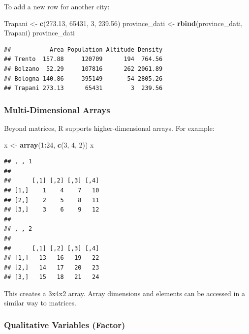 \documentclass[
]{article}
\newenvironment{Shaded}{\begin{snugshade}}{\end{snugshade}}
\newcommand{\DecValTok}[1]{\textcolor[rgb]{0.00,0.00,0.81}{#1}}
\newcommand{\FloatTok}[1]{\textcolor[rgb]{0.00,0.00,0.81}{#1}}
\newcommand{\FunctionTok}[1]{\textcolor[rgb]{0.13,0.29,0.53}{\textbf{#1}}}
\newcommand{\NormalTok}[1]{#1}
\newcommand{\OtherTok}[1]{\textcolor[rgb]{0.56,0.35,0.01}{#1}}
\newcommand{\SpecialCharTok}[1]{\textcolor[rgb]{0.81,0.36,0.00}{\textbf{#1}}}
\begin{document}
To add a new row for another city:

\begin{Shaded}
\begin{Highlighting}[]
\NormalTok{Trapani }\OtherTok{\textless{}{-}} \FunctionTok{c}\NormalTok{(}\FloatTok{273.13}\NormalTok{, }\DecValTok{65431}\NormalTok{, }\DecValTok{3}\NormalTok{, }\FloatTok{239.56}\NormalTok{)}
\NormalTok{province\_dati }\OtherTok{\textless{}{-}} \FunctionTok{rbind}\NormalTok{(province\_dati, Trapani)}
\NormalTok{province\_dati}
\end{Highlighting}
\end{Shaded}

\begin{verbatim}
##           Area Population Altitude Density
## Trento  157.88     120709      194  764.56
## Bolzano  52.29     107816      262 2061.89
## Bologna 140.86     395149       54 2805.26
## Trapani 273.13      65431        3  239.56
\end{verbatim}

\hypertarget{multi-dimensional-arrays}{%
\subsubsection{Multi-Dimensional
Arrays}\label{multi-dimensional-arrays}}

Beyond matrices, R supports higher-dimensional arrays. For example:

\begin{Shaded}
\begin{Highlighting}[]
\NormalTok{x }\OtherTok{\textless{}{-}} \FunctionTok{array}\NormalTok{(}\DecValTok{1}\SpecialCharTok{:}\DecValTok{24}\NormalTok{, }\FunctionTok{c}\NormalTok{(}\DecValTok{3}\NormalTok{, }\DecValTok{4}\NormalTok{, }\DecValTok{2}\NormalTok{))}
\NormalTok{x}
\end{Highlighting}
\end{Shaded}

\begin{verbatim}
## , , 1
## 
##      [,1] [,2] [,3] [,4]
## [1,]    1    4    7   10
## [2,]    2    5    8   11
## [3,]    3    6    9   12
## 
## , , 2
## 
##      [,1] [,2] [,3] [,4]
## [1,]   13   16   19   22
## [2,]   14   17   20   23
## [3,]   15   18   21   24
\end{verbatim}

This creates a 3x4x2 array. Array dimensions and elements can be
accessed in a similar way to matrices.

\hypertarget{qualitative-variables-factor}{%
\subsubsection{Qualitative Variables
(Factor)}\label{qualitative-variables-factor}}
\end{document}
